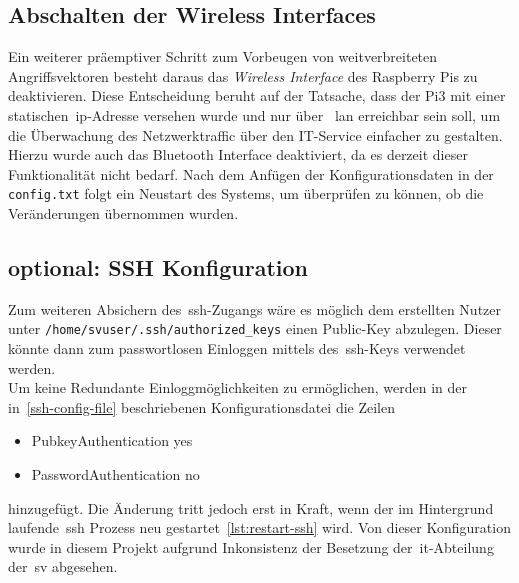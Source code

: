 \subsection{Abschalten der Wireless Interfaces}\label{subsec:abschalten-des-wireless-interface}
Ein weiterer präemptiver Schritt zum Vorbeugen von weitverbreiteten Angriffsvektoren besteht daraus das \textit{Wireless Interface} des Raspberry Pis zu deaktivieren.
Diese Entscheidung beruht auf der Tatsache, dass der Pi3 mit einer statischen~\gls{ip}-Adresse versehen wurde und nur über ~\gls{lan} erreichbar sein soll, um die Überwachung
des Netzwerktraffic über den IT-Service einfacher zu gestalten. \\

Hierzu wurde auch das Bluetooth Interface deaktiviert, da es derzeit dieser Funktionalität nicht bedarf.
Nach dem Anfügen der Konfigurationsdaten in der \texttt{config.txt} folgt ein Neustart des Systems, um überprüfen zu können, ob die Veränderungen übernommen wurden.
\subsection{optional: SSH Konfiguration}\label{subsec:ssh-konfiguration}
Zum weiteren Absichern des~\gls{ssh}-Zugangs wäre es möglich dem erstellten Nutzer unter \texttt{/home/svuser/.ssh/authorized\_keys} einen Public-Key abzulegen.
Dieser könnte dann zum passwortlosen Einloggen mittels des~\gls{ssh}-Keys verwendet werden.\\
\linebreak\linebreak
Um keine Redundante Einloggmöglichkeiten zu ermöglichen, werden in der in~\ref{ssh-config-file} beschriebenen Konfigurationsdatei die Zeilen
\begin{itemize}
    \item PubkeyAuthentication yes
    \item PasswordAuthentication no
\end{itemize}
hinzugefügt.
Die Änderung tritt jedoch erst in Kraft, wenn der im Hintergrund laufende~\gls{ssh} Prozess neu gestartet~\ref{lst:restart-ssh} wird.
Von dieser Konfiguration wurde in diesem Projekt aufgrund Inkonsistenz der Besetzung der~\gls{it}-Abteilung der~\gls{sv} abgesehen.
